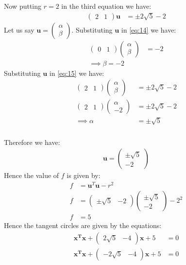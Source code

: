 \documentclass{beamer}
\newcommand{\myvec}[1]{\ensuremath{\begin{pmatrix}#1\end{pmatrix}}}
\renewcommand{\vec}[1]{\mathbf{#1}}
\begin{document}
\begin{frame}
\frametitle{}
Now putting $r=2$ in the third equation we have:
\begin{align}
\myvec{2 & 1}\vec{u} &= \pm2\sqrt{5}-2\label{eq:15}
\end{align}
Let us say $\vec{u} = \myvec{\alpha \\ \beta}$. Substituting $\vec{u}$ in \eqref{eq:14} we have:
\begin{align}
\myvec{0 & 1}\myvec{\alpha \\ \beta} &= -2\\
\implies \beta = -2
\end{align}
Substituting $\vec{u}$ in \eqref{eq:15} we have:
\begin{align}
\myvec{2 & 1}\myvec{\alpha \\ \beta} &= \pm2\sqrt{5} -2\\
\myvec{2 & 1}\myvec{\alpha \\ -2} &= \pm2\sqrt{5} -2\\
\implies \alpha &= \pm\sqrt{5}
\end{align}
\end{frame}

\begin{frame}
\frametitle{}
Therefore we have:
\begin{align}
\vec{u} = \myvec{\pm\sqrt{5} \\ -2}
\end{align}
Hence the value of $f$ is given by:
\begin{align}
f &=\vec{u}^T\vec{u}-r^2\\
f &= \myvec{\pm\sqrt{5} & -2}\myvec{\pm\sqrt{5} \\ -2} - 2^2\\
f &= 5
\end{align}
Hence the tangent circles are given by the equations:
\begin{align}
\vec{x^T}\vec{x} + \myvec{2\sqrt{5} & -4}\vec{x} + 5 &= 0 \\
\vec{x^T}\vec{x} + \myvec{-2\sqrt{5} & -4}\vec{x} + 5 &= 0
\end{align}
\end{frame}
\end{document}
